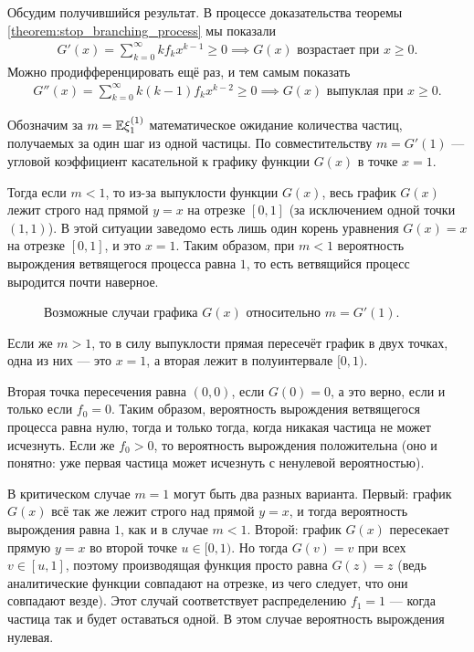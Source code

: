 \documentclass[../main.tex]{subfiles}
\begin{document}
 \begin{remrk*}

  Обсудим получившийся результат. В процессе доказательства теоремы \ref{theorem:stop_branching_process} мы показали
  \begin{align*}
   G'(x) = \sum_{k=0}^{\infty} k f_k x^{k-1} \geqslant 0 \implies G(x) \text{ возрастает при } x \geqslant 0.
  \end{align*} Можно продифференцировать ещё раз, и тем самым показать
  \begin{align*}
   G''(x) = \sum_{k=0}^{\infty} k (k-1) f_k x^{k-2} \geqslant 0 \implies G(x) \text{ выпуклая при } x \geqslant 0.
  \end{align*}

  Обозначим за $ m = \mathbb E \xi_1^{(1)} $ математическое ожидание количества частиц, получаемых за один шаг из одной частицы. По совместительству $ m = G'(1) $ --- угловой коэффициент касательной к графику функции $ G(x) $ в точке $ x = 1 $.

  Тогда если $ m < 1 $, то из-за выпуклости функции $ G(x) $, весь график $ G(x) $ лежит строго над прямой $ y = x $ на отрезке $ [0,1] $ (за исключением одной точки $ (1,1) $). В этой ситуации заведомо есть лишь один корень уравнения $ G(x) = x $ на отрезке $ [0,1] $, и это $ x = 1 $. Таким образом, при $ m < 1 $ вероятность вырождения ветвящегося процесса равна $ 1 $, то есть ветвящийся процесс выродится почти наверное.

  \begin{figure}[ht]
   \centering
   \caption{Возможные случаи графика $ G(x) $ относительно $ m=G'(1) $.}
   \label{fig:g_convex}
  \end{figure}

  Если же $ m > 1 $, то в силу выпуклости прямая пересечёт график в двух точках, одна из них --- это $ x = 1 $, а вторая лежит в полуинтервале $ [0,1) $. 

  Вторая точка пересечения равна $ (0,0) $, если $ G(0) = 0 $, а это верно, если и только если $ f_0 = 0 $. Таким образом, вероятность вырождения ветвящегося процесса равна нулю, тогда и только тогда, когда никакая частица не может исчезнуть. Если же $ f_0 > 0 $, то вероятность вырождения положительна (оно и понятно: уже первая частица может исчезнуть с ненулевой вероятностью).

  В критическом случае $ m = 1 $ могут быть два разных варианта. Первый: график $ G(x) $ всё так же лежит строго над прямой $ y = x $, и тогда вероятность вырождения равна $ 1 $, как и в случае $ m < 1 $. Второй: график $ G(x) $ пересекает прямую $ y = x $ во второй точке $ u \in [0, 1) $. Но тогда $ G(v) = v $ при всех $ v \in [u, 1] $, поэтому производящая функция просто равна $ G(z)=z $ (ведь аналитические функции совпадают на отрезке, из чего следует, что они совпадают везде). Этот случай соответствует распределению $ f_1 = 1 $ --- когда частица так и будет оставаться одной. В этом случае вероятность вырождения нулевая.

 \end{remrk*}
\end{document}
